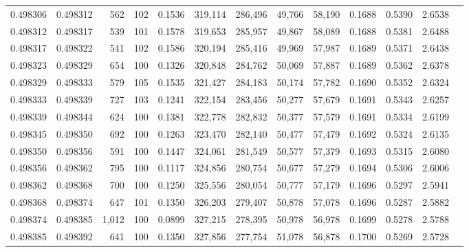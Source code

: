 \begin{tabular}{rrrrrrrrrrrrr}
0.498306 & 0.498312 &   562 & 102 &                                     0.1536 & 319,114 & 286,496 &  49,766 &  58,190 & 0.1688 & 0.5390 & 2.6538 \\
0.498312 & 0.498317 &   539 & 101 &                                     0.1578 & 319,653 & 285,957 &  49,867 &  58,089 & 0.1688 & 0.5381 & 2.6488 \\
0.498317 & 0.498322 &   541 & 102 &                                     0.1586 & 320,194 & 285,416 &  49,969 &  57,987 & 0.1689 & 0.5371 & 2.6438 \\
0.498323 & 0.498329 &   654 & 100 &                                     0.1326 & 320,848 & 284,762 &  50,069 &  57,887 & 0.1689 & 0.5362 & 2.6378 \\
0.498329 & 0.498333 &   579 & 105 &                                     0.1535 & 321,427 & 284,183 &  50,174 &  57,782 & 0.1690 & 0.5352 & 2.6324 \\
0.498333 & 0.498339 &   727 & 103 &                                     0.1241 & 322,154 & 283,456 &  50,277 &  57,679 & 0.1691 & 0.5343 & 2.6257 \\
0.498339 & 0.498344 &   624 & 100 &                                     0.1381 & 322,778 & 282,832 &  50,377 &  57,579 & 0.1691 & 0.5334 & 2.6199 \\
0.498345 & 0.498350 &   692 & 100 &                                     0.1263 & 323,470 & 282,140 &  50,477 &  57,479 & 0.1692 & 0.5324 & 2.6135 \\
0.498350 & 0.498356 &   591 & 100 &                                     0.1447 & 324,061 & 281,549 &  50,577 &  57,379 & 0.1693 & 0.5315 & 2.6080 \\
0.498356 & 0.498362 &   795 & 100 &                                     0.1117 & 324,856 & 280,754 &  50,677 &  57,279 & 0.1694 & 0.5306 & 2.6006 \\
0.498362 & 0.498368 &   700 & 100 &                                     0.1250 & 325,556 & 280,054 &  50,777 &  57,179 & 0.1696 & 0.5297 & 2.5941 \\
0.498368 & 0.498374 &   647 & 101 &                                     0.1350 & 326,203 & 279,407 &  50,878 &  57,078 & 0.1696 & 0.5287 & 2.5882 \\
0.498374 & 0.498385 & 1,012 & 100 &                                     0.0899 & 327,215 & 278,395 &  50,978 &  56,978 & 0.1699 & 0.5278 & 2.5788 \\
0.498385 & 0.498392 &   641 & 100 &                                     0.1350 & 327,856 & 277,754 &  51,078 &  56,878 & 0.1700 & 0.5269 & 2.5728 \\

\end{tabular}
